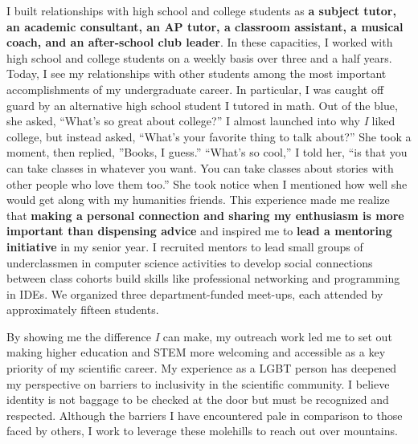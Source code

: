 \noindent
\underline{}
I built relationships with high school and college students as \textbf{a subject tutor, an academic consultant, an AP tutor, a classroom assistant, a musical coach, and an after-school club leader}.
In these capacities, I worked with high school and college students on a weekly basis over three and a half years.
Today, I see my relationships with other students among the most important accomplishments of my undergraduate career.
In particular, I was caught off guard by an alternative high school student I tutored in math.
Out of the blue, she asked, ``What's so great about college?''
I almost launched into why \textit{I} liked college, but instead asked, ``What's your favorite thing to talk about?''
She took a moment, then replied, ''Books, I guess.''
``What's so cool,'' I told her, ``is that you can take classes in whatever you want.
You can take classes about stories with other people who love them too.''
She took notice when I mentioned how well she would get along with my humanities friends.
This experience made me realize that \textbf{making a personal connection and sharing my enthusiasm is more important than dispensing advice} and inspired me to \textbf{lead a mentoring initiative} in my senior year.
I recruited mentors to lead small groups of underclassmen in computer science activities to develop social connections between class cohorts build skills like professional networking and programming in IDEs.
We organized three department-funded meet-ups, each attended by approximately fifteen students.

By showing me the difference \textit{I} can make, my outreach work led me to set out making higher education and STEM more welcoming and accessible as a key priority of my scientific career.
My experience as a LGBT person has deepened my perspective on barriers to inclusivity in the scientific community.
I believe identity is not baggage to be checked at the door but must be recognized and respected.
Although the barriers I have encountered pale in comparison to those faced by others, I work to leverage these molehills to reach out over mountains.

